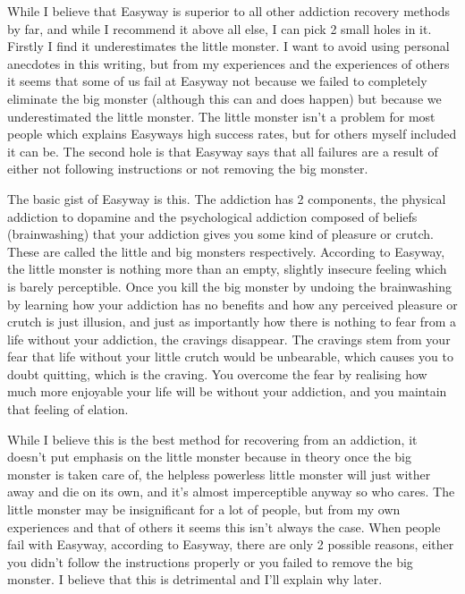 \documentclass[
]{book}
\begin{document}
While I believe that Easyway is superior to all other addiction recovery methods by far, and while I recommend it above all else, I can pick 2 small holes in it. Firstly I find it underestimates the little monster. I want to avoid using personal anecdotes in this writing, but from my experiences and the experiences of others it seems that some of us fail at Easyway not because we failed to completely eliminate the big monster (although this can and does happen) but because we underestimated the little monster. The little monster isn't a problem for most people which explains Easyways high success rates, but for others myself included it can be. The second hole is that Easyway says that all failures are a result of either not following instructions or not removing the big monster.

The basic gist of Easyway is this. The addiction has 2 components, the physical addiction to dopamine and the psychological addiction composed of beliefs (brainwashing) that your addiction gives you some kind of pleasure or crutch. These are called the little and big monsters respectively. According to Easyway, the little monster is nothing more than an empty, slightly insecure feeling which is barely perceptible. Once you kill the big monster by undoing the brainwashing by learning how your addiction has no benefits and how any perceived pleasure or crutch is just illusion, and just as importantly how there is nothing to fear from a life without your addiction, the cravings disappear. The cravings stem from your fear that life without your little crutch would be unbearable, which causes you to doubt quitting, which is the craving. You overcome the fear by realising how much more enjoyable your life will be without your addiction, and you maintain that feeling of elation.

While I believe this is the best method for recovering from an addiction, it doesn't put emphasis on the little monster because in theory once the big monster is taken care of, the helpless powerless little monster will just wither away and die on its own, and it's almost imperceptible anyway so who cares. The little monster may be insignificant for a lot of people, but from my own experiences and that of others it seems this isn't always the case. When people fail with Easyway, according to Easyway, there are only 2 possible reasons, either you didn't follow the instructions properly or you failed to remove the big monster. I believe that this is detrimental and I'll explain why later.
\end{document}

